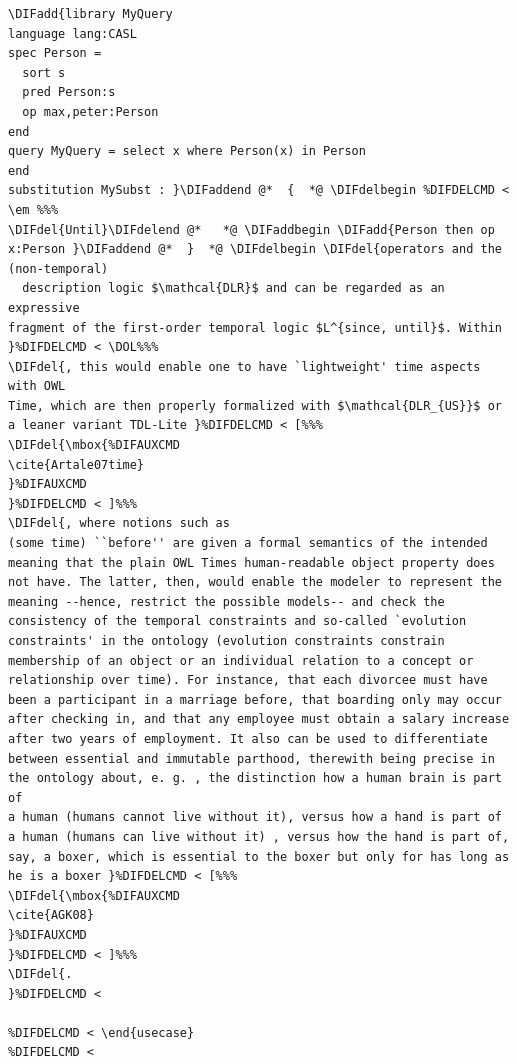 \documentclass[10pt,fleqn,final]{scrreprt}
\newcommand*{\DOL}{\ensuremath{\mathsf{DOL}}\xspace}
\providecommand{\DIFadd}[1]{{\protect\color{blue}\uwave{#1}}} %
\providecommand{\DIFdel}[1]{{\protect\color{red}\sout{#1}}}                      %
\providecommand{\DIFaddbegin}{} %
\providecommand{\DIFaddend}{} %
\providecommand{\DIFdelbegin}{} %
\providecommand{\DIFdelend}{} %
\begin{document}
\begin{lstlisting}[basicstyle=\ttfamily,language=dolText,alsolanguage=CASL,escapechar=@,mathescape]
%DIF > prefix( lang:  <http://purl.net/DOL/languages/> )%
\DIFadd{library MyQuery
language lang:CASL
spec Person =
  sort s
  pred Person:s 
  op max,peter:Person
end
query MyQuery = select x where Person(x) in Person
end
substitution MySubst : }\DIFaddend @*  {  *@ \DIFdelbegin %DIFDELCMD < \em %%%
\DIFdel{Until}\DIFdelend @*   *@ \DIFaddbegin \DIFadd{Person then op x:Person }\DIFaddend @*  }  *@ \DIFdelbegin \DIFdel{operators and the (non-temporal)
  description logic $\mathcal{DLR}$ and can be regarded as an expressive
fragment of the first-order temporal logic $L^{since, until}$. Within
}%DIFDELCMD < \DOL%%%
\DIFdel{, this would enable one to have `lightweight' time aspects with OWL
Time, which are then properly formalized with $\mathcal{DLR_{US}}$ or
a leaner variant TDL-Lite }%DIFDELCMD < [%%%
\DIFdel{\mbox{%DIFAUXCMD
\cite{Artale07time}
}%DIFAUXCMD
}%DIFDELCMD < ]%%%
\DIFdel{, where notions such as
(some time) ``before'' are given a formal semantics of the intended
meaning that the plain OWL Times human-readable object property does
not have. The latter, then, would enable the modeler to represent the
meaning --hence, restrict the possible models-- and check the
consistency of the temporal constraints and so-called `evolution
constraints' in the ontology (evolution constraints constrain
membership of an object or an individual relation to a concept or
relationship over time). For instance, that each divorcee must have
been a participant in a marriage before, that boarding only may occur
after checking in, and that any employee must obtain a salary increase
after two years of employment. It also can be used to differentiate
between essential and immutable parthood, therewith being precise in
the ontology about, e. g. , the distinction how a human brain is part of
a human (humans cannot live without it), versus how a hand is part of
a human (humans can live without it) , versus how the hand is part of,
say, a boxer, which is essential to the boxer but only for has long as
he is a boxer }%DIFDELCMD < [%%%
\DIFdel{\mbox{%DIFAUXCMD
\cite{AGK08}
}%DIFAUXCMD
}%DIFDELCMD < ]%%%
\DIFdel{.
}%DIFDELCMD < 

%DIFDELCMD < \end{usecase}
%DIFDELCMD < 


\end{lstlisting}
\end{document}
